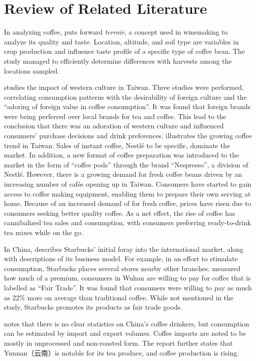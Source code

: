 \section{Review of Related Literature}\label{sec:rrl}

In analyzing coffee, \autocite{silva_characterization_2014} puts forward
\emph{terroir}, a concept used in winemaking to analyze its quality and taste.
Location, altitude, and soil type are variables in crop production and influence
taste profile of a specific type of coffee bean. The study managed to
efficiently determine differences with harvests among the locations sampled.

\autocite{su_impact_2006} studies the impact of western culture in Taiwan. Three
studies were performed, correlating consumption patterns with the desirability
of foreign culture and the ``adoring of foreign value in coffee consumption''.
It was found that foreign brands were being perferred over local brands for tea
and coffee. This lead to the conclusion that there was an adoration of western
culture and influenced consumers' purchase decisions and drink preferences.
\autocite{euromonitor_international_coffee_2015} illustrates the growing coffee
trend in Taiwan. Sales of instant coffee, Nestlé to be specific, dominate the
market. In addition, a new format of coffee preparation was introduced to the
market in the form of ``coffee pods'' through the brand ``Nespresso'', a
division of Nestlé. However, there is a growing demand for fresh coffee beans
driven by an increasing number of cafés opening up in Taiwan. Consumers have
started to gain access to coffee making equipment, enabling them to prepare
their own serving at home. Because of an increased demand of for fresh coffee,
prices have risen due to consumers seeking better quality coffee. As a net
effect, the rise of coffee has cannibalized tea sales and consumption, with
consumers preferring ready-to-drink tea mixes while on the go.

In China, \autocite{harrison_exporting_2005} describes Starbucks' initial foray
into the international market, along with descriptions of its business model.
For example, in an effort to stimulate consumption, Starbucks places several
stores nearby other branches. \autocite{yang_consumer_2012} measured how much of
a premium, consumers in Wuhan are willing to pay for coffee that is labelled as
``Fair Trade''. It was found that consumers were willing to pay as much as 22\%
more on average than traditional coffee. While not mentioned in the study,
Starbucks promotes its products as fair trade goods.

\autocite{international_coffee_council_coffee_2015} notes that there is no clear
statistics on China's coffee drinkers, but consumption can be estimated by
import and export volumes. Coffee imports are noted to be mostly in unprocessed
and non-roasted form. The report further states  that Yunnan（云南）is notable for
its tea produce, and coffee production is rising.
